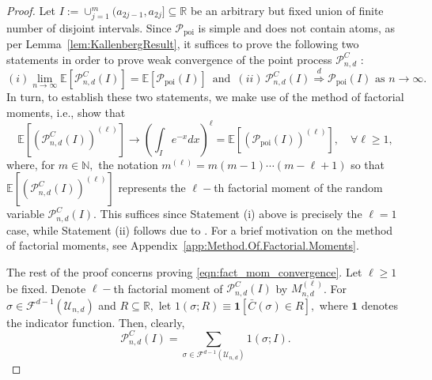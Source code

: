 \documentclass[12pt]{amsart}
\newcommand{\Exp}{\mathbb{E}}
\newcommand{\PoiP}{\mathscr{P}_{\text{poi}}}
\newcommand{\PoiF}{\mathscr{P}_{n, d}^{C}}
\newcommand{\gt}[1]{\textcolor{blue}{#1}}
\renewcommand{\gt}[1]{#1}
\numberwithin{equation}{section}
\numberwithin{theorem}{section}
\newcommand{\Real}{\mathbb R}
\newcommand{\1}{\mathbf{1}}
\def\F{\mathcal{F}}
\def\U{\mathcal{U}}
\begin{document}
\begin{proof} 	Let $I := \cup_{j = 1}^{m} (a_{2j-1}, a_{2j}] \subseteq \mathbb{R}$ be an arbitrary but fixed union of finite number of disjoint intervals. Since $\PoiP$ is simple and does not contain atoms, as per Lemma~\ref{lem:KallenbergResult}, it suffices to prove the following two statements in order to prove weak convergence of the point process $\PoiF$ :
%
\[ (i) \lim_{n \to \infty} \mathbb{E}[\PoiF(I)] = \mathbb{E}[\PoiP(I)] \, \, \, \mbox{and} \, \, \,		
(ii) \, \PoiF(I) \stackrel{d}{\Rightarrow} \PoiP(I) \, \, \mbox{as} \, \, n \to \infty. \]
%
\gt{In turn, to establish these two statements, we make use of the method of factorial moments, i.e., show that}
%
\begin{equation}
\label{eqn:fact_mom_convergence}
\Exp{[(\PoiF(I))^{(\ell)}]} \to \left(\int_{I} e^{-x} dx
\right)^{\ell} = \Exp{[(\PoiP(I))^{(\ell)}]}, \quad \forall \ell \geq 1,
\end{equation}
%
\gt{where, for $m \in \mathbb{N},$ the notation $m^{(\ell)} = m (m - 1) \cdots (m - \ell + 1)$ so that $\Exp{[(\PoiF(I))^{(\ell)}]}$ represents the $\ell-$th factorial moment of the random variable $\PoiF(I).$ This suffices since Statement (i) above is precisely the $\ell = 1$ case, while Statement (ii) follows due to \cite[Theorem 2.4]{Hofstad16}.} For a brief motivation on the method of factorial moments, see Appendix~\ref{app:Method.Of.Factorial.Moments}.


The rest of the proof concerns proving \eqref{eqn:fact_mom_convergence}. Let $\ell \geq 1$ be fixed. Denote $\ell-$th factorial moment of $\PoiF(I)$ by $M_{n, d}^{(\ell)}$. For $\sigma \in \F^{d - 1}(\U_{n, d})$ and $R \subseteq \Real,$ let $1(\sigma; R) \equiv \1[\bar{C}(\sigma) \in R],$ where $\1$ denotes the indicator function. Then, clearly,
%
\[
\PoiF(I) = \sum_{\sigma \in \F^{d - 1}(\U_{n, d})} 1(\sigma; I).
\]


\end{proof}
\end{document}
